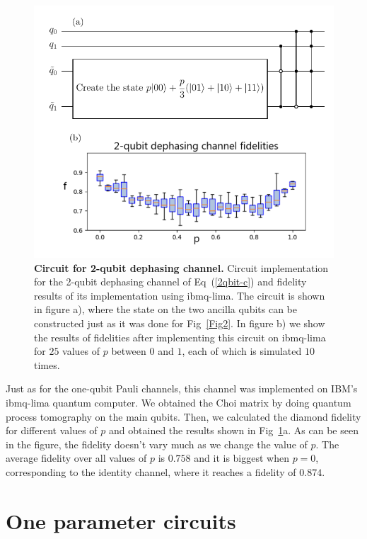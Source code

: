 \documentclass[10pt,letterpaper]{article} %
\newcommand{\fref}[1]{Fig~\ref{#1}}
\newcommand{\eref}[1]{Eq~(\ref{#1})}
\begin{document}
\begin{figure} %
\centering
\includegraphics{images/qbit-im.pdf}
\caption{{\bf Circuit for 2-qubit dephasing channel.}  Circuit implementation
for the 2-qubit dephasing channel of \eref{2qbit-c} and fidelity results of its implementation using ibmq-lima.
 The circuit is shown in figure a), where the  state on the two
ancilla qubits can be constructed just as it was done for \fref{Fig2}. 
In figure b) we show the results of fidelities after implementing
this circuit on ibmq-lima for $25$ values of $p$ between $0$ and $1$, 
each of which is simulated $10$ times.
}
\label{2qbit}
\end{figure} %

Just as for the one-qubit Pauli channels, this 
channel was implemented on IBM's ibmq-lima  quantum computer. We obtained the Choi 
matrix by doing quantum process tomography on
the main qubits. Then, we calculated the diamond fidelity for different values of $p$ and
obtained the results shown in \fref{2qbit}a. 
As can be seen in the figure, the fidelity doesn't vary much as we change the value of $p$.
The average fidelity over all values of $p$ is $0.758$ and it is biggest when $p=0$,
corresponding to the identity channel, where it reaches a fidelity of $0.874$.

\section{One parameter circuits} %
\label{sec: 1PR Circuits}
\end{document}
